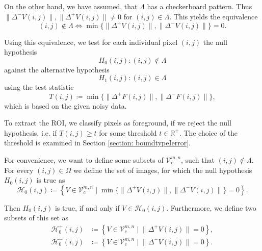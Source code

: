 \documentclass[a4paper,12pt]{article}
\newcommand{\norm}[1]{\lVert#1\rVert}
\theoremstyle{plain}
\theoremstyle{definition}
\numberwithin{equation}{section}
\begin{document}
On the other hand, we have assumed, that $\varLambda$ has a checkerboard pattern. Thus $\norm{\Delta^- V(i, j)}, \norm{\Delta^+ V(i, j)} \neq 0$ for $(i, j) \in \varLambda$. This yields the equivalence
\begin{equation*}
	(i, j) \notin \varLambda \Leftrightarrow \min \{ \norm{\Delta^+ V(i, j)}, \norm{\Delta^- V(i, j)} \} = 0.
\end{equation*}

Using this equivalence, we test for each individual pixel $(i, j)$ the null hypothesis
\begin{equation}\label{nullhypothesis}
	H_0(i, j): (i, j) \notin \varLambda
\end{equation}
against the alternative hypothesis
\begin{equation}\label{alternativehypothesis}
	H_1(i, j): (i, j) \in \varLambda
\end{equation}
using the test statistic
\begin{equation}\label{teststatistic}
	T(i, j) \coloneqq \min \{ \norm{\Delta^+ F(i, j)}, \norm{\Delta^- F(i, j)} \},
\end{equation}
which is based on the given noisy data.

To extract the ROI, we classify pixels as foreground, if we reject the null hypothesis, i.e. if $T(i, j) \geq t$ for some threshold $t \in \mathbb{R}^+$. The choice of the threshold is examined in Section \ref{section: boundtypeIerror}.

For convenience, we want to define some subsets of $\mathcal{V}_c^{m, n}$, such that $(i, j) \notin \varLambda$. For every $(i, j) \in \Omega$ we define the set of images, for which the null hypothesis $H_0(i, j)$ is true as
\begin{equation}
	\mathcal{H}_0(i, j) \coloneqq \left\{ V \in \mathcal{V}_c^{m, n} \mid \min \{ \norm{\Delta^+ V(i, j)}, \norm{\Delta^- V(i, j)} \} = 0 \right\}.
\end{equation}

Then $H_0(i, j)$ is true, if and only if $V \in \mathcal{H}_0(i, j)$. Furthermore, we define two subsets of this set as
\begin{align}
	\mathcal{H}_0^+(i, j) &\coloneqq \left\{ V \in \mathcal{V}_c^{m, n} \mid \norm{\Delta^+ V(i, j)} = 0 \right\} \label{setH0+}, \\
	\mathcal{H}_0^-(i, j) &\coloneqq \left\{ V \in \mathcal{V}_c^{m, n} \mid \norm{\Delta^- V(i, j)} = 0 \right\} \label{setH0-}.
\end{align}
\end{document}
